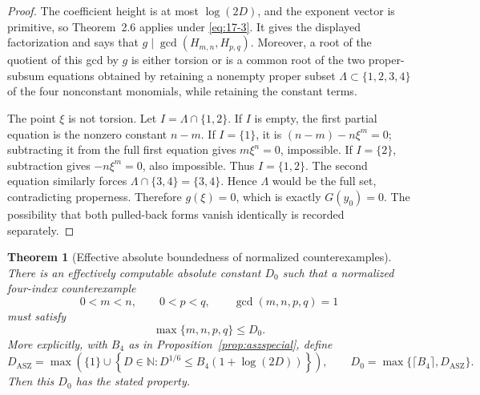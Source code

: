 \documentclass[11pt]{article}
\numberwithin{equation}{section}
\newtheorem{theorem}{Theorem}[section]
\theoremstyle{definition}
\begin{document}
\begin{proof}
The coefficient height is at most \(\log(2D)\), and the exponent vector is
primitive, so Theorem~2.6 applies under \eqref{eq:17-3}.  It gives the displayed
factorization and says that \(g\mid\gcd(H_{m,n},H_{p,q})\).  Moreover, a
root of the quotient of this gcd by \(g\) is either torsion or is a common
root of the two proper-subsum equations obtained by retaining a nonempty
proper subset \(\Lambda\subset\{1,2,3,4\}\) of the four nonconstant
monomials, while retaining the constant terms.

The point \(\xi\) is not torsion.  Let
\(I=\Lambda\cap\{1,2\}\).  If \(I\) is empty, the first partial equation
is the nonzero constant \(n-m\).  If \(I=\{1\}\), it is
\((n-m)-n\xi^m=0\); subtracting it from the full first equation gives
\(m\xi^n=0\), impossible.  If \(I=\{2\}\), subtraction gives
\(-n\xi^m=0\), also impossible.  Thus \(I=\{1,2\}\).  The second
equation similarly forces
\(\Lambda\cap\{3,4\}=\{3,4\}\).  Hence \(\Lambda\) would be the full
set, contradicting properness.  Therefore \(g(\xi)=0\), which is exactly
\(G(y_0)=0\).  The possibility that both pulled-back forms vanish
identically is recorded separately.
\end{proof}

\begin{theorem}[Effective absolute boundedness of normalized counterexamples]
\label{thm:hyperplane}
There is an effectively computable absolute constant \(D_0\) such that a
normalized four-index counterexample
\[
 0<m<n,\qquad0<p<q,\qquad\gcd(m,n,p,q)=1
\]
must satisfy
\[
 \max\{m,n,p,q\}\leq D_0.
\]
More explicitly, with \(B_4\) as in
Proposition~\ref{prop:aszspecial}, define
\begin{equation}
 D_{\mathrm{ASZ}}=
 \max\!\left(
 \{1\}\cup
 \left\{D\in\mathbb N:
 D^{1/6}\leq B_4(1+\log(2D))\right\}
 \right),
 \qquad
 D_0=\max\{\lceil B_4\rceil,D_{\mathrm{ASZ}}\}.
 \label{eq:17-4}
\end{equation}
Then this \(D_0\) has the stated property.
\end{theorem}
\end{document}
